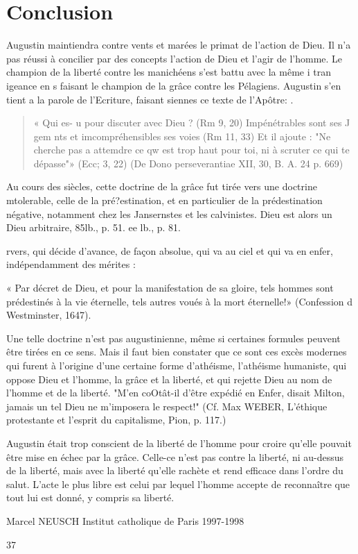 \section{Conclusion}
\begin{Synthesis}
 Augustin maintiendra contre vents et marées le primat de l'action de Dieu. Il n'a pas réussi à concilier par des concepts l'action de Dieu et l'agir de l'homme. Le champion de la liberté contre les manichéens s'est battu avec la même i tran igeance en s faisant le champion de la grâce contre les Pélagiens. Augustin s'en tient a la parole de l'Ecriture, faisant siennes ce texte de l'Apôtre: .
\begin{quote}
    «  Qui es- u pour discuter avec Dieu ? (Rm 9, 20)  Impénétrables  sont ses J gem nts et imcompréhensibles ses voies (Rm 11, 33) Et il ajoute : "Ne cherche pas a attemdre ce qw est trop haut pour toi, ni à scruter ce qui te dépasse"» (Ecc; 3, 22) (De Dono perseverantiae XII, 30, B. A. 24 p. 669)
\end{quote}
\end{Synthesis}




Au cours des siècles, cette doctrine de la grâce fut tirée vers une doctrine mtolerable, celle de la pré?estination, et en particulier de la prédestination négative, notamment chez les Jansernstes et les calvinistes. Dieu est alors un Dieu arbitraire,
85lb., p. 51.
ee lb., p. 81.
 
rvers, qui décide d'avance, de façon absolue, qui va au ciel et qui va en enfer, indépendamment des mérites :

« Par décret de Dieu, et pour la manifestation de sa gloire, tels hommes sont prédestinés à la vie éternelle, tels autres voués à la mort éternelle!» (Confession d Westminster, 1647).

Une telle doctrine n'est pas augustinienne, même si certaines formules peuvent être tirées en ce sens. Mais il faut bien constater que ce sont ces excès modernes qui furent à l'origine d'une certaine forme d'athéisme, l'athéisme humaniste, qui oppose Dieu et l'homme, la grâce et la liberté, et qui rejette Dieu au nom de l'homme et de la liberté. "M'en coOtât-il d'être expédié en Enfer, disait Milton, jamais un tel Dieu ne m'imposera le respect!" (Cf. Max WEBER, L'éthique protestante et l'esprit du capitalisme, Pion, p. 117.)

Augustin était trop conscient de la liberté de l'homme pour croire qu'elle pouvait être mise en échec par la grâce. Celle-ce n'est pas contre la liberté, ni au-dessus de la liberté, mais avec la liberté qu'elle rachète et rend efficace dans l'ordre du salut. L'acte le plus libre est celui par lequel l'homme accepte de reconnaître que tout lui est donné, y compris sa liberté.

Marcel NEUSCH Institut catholique de Paris
1997-1998

























37
